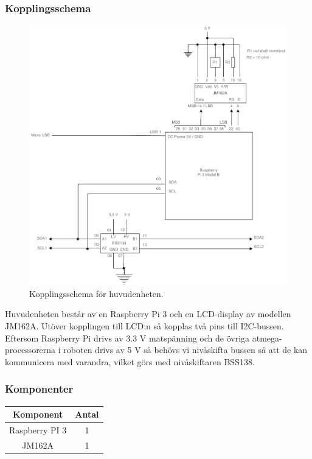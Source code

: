 \documentclass{article}
\begin{document}
\subsubsection{Kopplingsschema}
\begin{figure}[H]
\centering
\includegraphics[scale=0.45]{Huvudenhet_kopplingsschema}
\caption{Kopplingsschema för huvudenheten.}
\label{fig:huvudenhet_kopplingsschema}
\end{figure}

Huvudenheten består av en Raspberry Pi 3 och en LCD-display av modellen JM162A. Utöver kopplingen till LCD:n så kopplas två pins till I2C-bussen.
Eftersom Raspberry Pi drivs av 3.3 V matspänning och de övriga atmega-processorerna i roboten drivs av 5 V så behövs vi nivåskifta bussen så att de kan kommunicera med varandra, vilket görs med nivåskiftaren BSS138.


\subsubsection{Komponenter}

\begin{table}[H]
   \centering
  \begin{tabular}{ | c | c | }
    \hline
    \textbf{Komponent} & \textbf{Antal} \\
    \hline
    Raspberry PI 3 & 1 \\
    \hline
    JM162A & 1 \\
    \hline
  \end{tabular}
\end{table}
\end{document}
